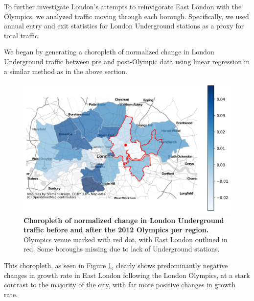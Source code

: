 \documentclass[11pt, twocolumn]{article}
\begin{document}
\begin{enumerate}
    To further investigate London's attempts to reinvigorate East London with the Olympics, we analyzed traffic moving through each borough. Specifically, we used annual entry and exit statistics for London Underground stations as a proxy for total traffic.
    
    We began by generating a choropleth of normalized change in London Underground traffic between pre and post-Olympic data using linear regression in a similar method as in the above section.
    
    \begin{figure}[H]
        \centering
            \includegraphics[scale=0.45]{underground_slope.png}
        \caption{\textbf{Choropleth of normalized change in London Underground traffic before and after the 2012 Olympics per region.} Olympics venue marked with red dot, with East London outlined in red. Some boroughs missing due to lack of Underground stations.}
        \label{fig:underground_slope}
    \end{figure}
    
    This choropleth, as seen in Figure \ref{fig:underground_slope}, clearly shows predominantly negative changes in growth rate in East London following the London Olympics, at a stark contrast to the majority of the city, with far more positive changes in growth rate.
    

\end{enumerate}
\end{document}
